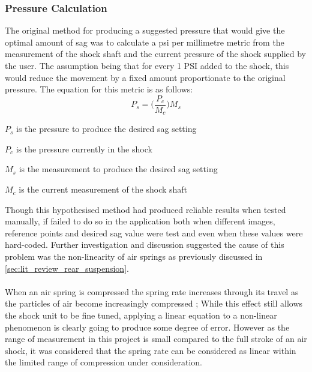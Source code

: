 		\subsubsection{Pressure Calculation}\label{sec:results_pressure_calculation}
			The original method for producing a suggested pressure that would give the optimal amount of sag was to calculate a psi per millimetre metric from the measurement of the shock shaft and the current pressure of the shock supplied by the user. The assumption being that for every 1 PSI added to the shock, this would reduce the movement by a fixed amount proportionate to the original pressure. The equation for this metric is as follows:
			\begin{equation}
				\label{equ:pxpermm}
				P_s = \Bigg(\frac{P_c}{M_c}\Bigg)M_s
			\end{equation}
			\begin{where}
				\item $P_s$ is the pressure to produce the desired sag setting
				\item $P_c$ is the pressure currently in the shock
				\item $M_s$ is the measurement to produce the desired sag setting
				\item $M_c$ is the current measurement of the shock shaft
			\end{where}
			\vspace{5mm}
			Though this hypothesised method had produced reliable results when tested manually, if failed to do so in the application both when different images, reference points and desired sag value were test and even when these values were hard-coded. Further investigation and discussion suggested the cause of this problem was the non-linearity of air springs as previously discussed in \ref{sec:lit_review_rear_suspension}.
			\\\\
			When an air spring is compressed the spring rate increases through its travel as the particles of air become increasingly compressed \citep{goodyear2014air}; While this effect still allows the shock unit to be fine tuned, applying a linear equation to a non-linear phenomenon is clearly going to produce some degree of error. However as the range of measurement in this project is small compared to the full stroke of an air shock, it was considered that the spring rate can be considered as linear within the limited range of compression under consideration.
			\\\\
